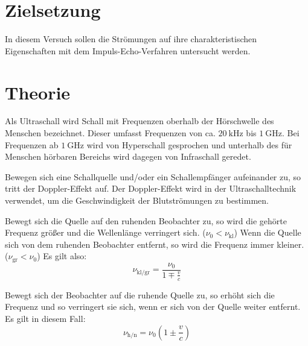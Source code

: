 \section{Zielsetzung}
\label{sec:Zielsetzung}

In diesem Versuch sollen die Strömungen auf ihre charakteristischen Eigenschaften mit dem Impuls-Echo-Verfahren untersucht werden.

\section{Theorie}
\label{sec:Theorie}

Als Ultraschall wird Schall mit Frequenzen oberhalb der Hörschwelle des Menschen bezeichnet. Dieser umfasst Frequenzen von ca. $\SI{20}{\kilo\hertz}$ bis $\SI{1}{\giga\hertz}$. Bei Frequenzen ab $\SI{1}{\giga\hertz}$ wird von Hyperschall gesprochen und unterhalb des für Menschen hörbaren Bereichs wird dagegen von Infraschall geredet.

Bewegen sich eine Schallquelle und/oder ein Schallempfänger aufeinander zu, so tritt der Doppler-Effekt auf. Der Doppler-Effekt wird in der Ultraschalltechnik verwendet, um die Geschwindigkeit der Blutströmungen zu bestimmen. 

Bewegt sich die Quelle auf den ruhenden Beobachter zu, so wird die gehörte Frequenz größer und die Wellenlänge verringert sich. ($\nu_0 < \nu_\text{kl}$) Wenn die Quelle sich von dem ruhenden Beobachter entfernt, so wird die Frequenz immer kleiner. ($\nu_\text{gr} < \nu_0$)
Es gilt also:
\begin{equation}
\label{eq:eq1}
\nu_\text{kl/gr} = \frac{\nu_0}{1 \mp \frac{v}{c}}
\end{equation}

Bewegt sich der Beobachter auf die ruhende Quelle zu, so erhöht sich die Frequenz und so verringert sie sich, wenn er sich von der Quelle weiter entfernt.
Es gilt in diesem Fall:
\begin{equation}
\label{eq:eq2}
\nu_\text{h/n} = \nu_0 \left(1 \pm \frac{v}{c}\right)
\end{equation}

